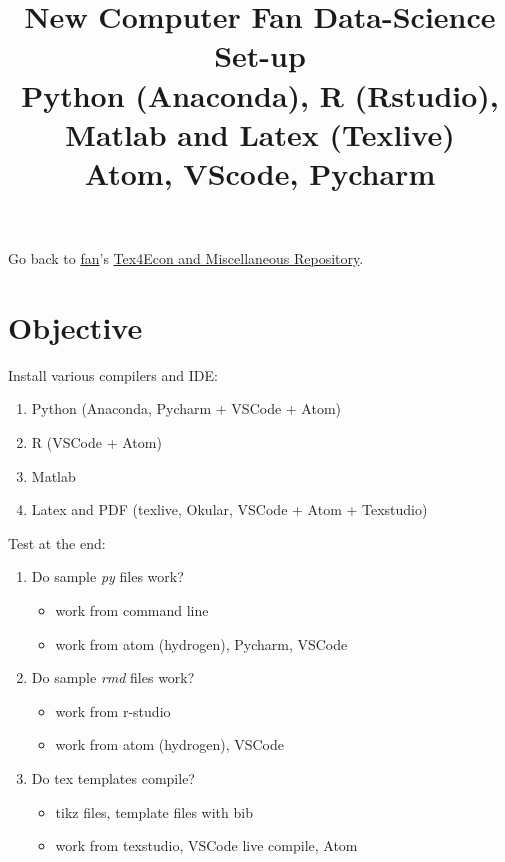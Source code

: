 \documentclass[]{article}
\title{New Computer Fan Data-Science Set-up\\
Python (Anaconda), R (Rstudio), Matlab and Latex (Texlive)\\
Atom, VScode, Pycharm}
\author{}
\date{\vspace{-2.5em}}
\providecommand{\tightlist}{%
  \setlength{\itemsep}{0pt}\setlength{\parskip}{0pt}}
\begin{document}
\maketitle

Go back to \href{http://fanwangecon.github.io/}{fan}'s
\href{http://fanwangecon.github.io/Tex4Econ/}{Tex4Econ and Miscellaneous
Repository}.

\hypertarget{objective}{%
\section{Objective}\label{objective}}

Install various compilers and IDE:

\begin{enumerate}
\def\labelenumi{\arabic{enumi}.}
\tightlist
\item
  Python (Anaconda, Pycharm + VSCode + Atom)
\item
  R (VSCode + Atom)
\item
  Matlab
\item
  Latex and PDF (texlive, Okular, VSCode + Atom + Texstudio)
\end{enumerate}

Test at the end:

\begin{enumerate}
\def\labelenumi{\arabic{enumi}.}
\tightlist
\item
  Do sample \emph{py} files work?

  \begin{itemize}
  \tightlist
  \item
    work from command line
  \item
    work from atom (hydrogen), Pycharm, VSCode
  \end{itemize}
\item
  Do sample \emph{rmd} files work?

  \begin{itemize}
  \tightlist
  \item
    work from r-studio
  \item
    work from atom (hydrogen), VSCode
  \end{itemize}
\item
  Do tex templates compile?

  \begin{itemize}
  \tightlist
  \item
    tikz files, template files with bib
  \item
    work from texstudio, VSCode live compile, Atom
  \end{itemize}
\end{enumerate}
\end{document}
